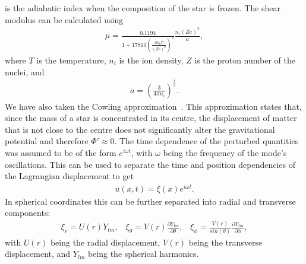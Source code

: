 \documentclass[fleqn,usenatbib]{mnras}
\begin{document}
\noindent is the adiabatic index when the composition of the star is frozen. The shear modulus can be calculated using~\cite{strohmayer1991shear}
\begin{align}
\mu=\frac{0.1194}{1+17810\left(\frac{ak_bT}{\left(Ze\right)^2}\right)^2}\frac{n_i\left(Ze\right)^2}{a},
\label{eq:varymu}
\end{align}
\noindent where $T$ is the temperature, $n_i$ is the ion density, $Z$ is the proton number of the nuclei, and 
\begin{align}
a=\left(\frac{3}{4\pi n_i}\right)^{\frac{1}{3}}.
\label{eq:mu1991a}
\end{align}
\noindent We have also taken the Cowling approximation~\cite{cowling1941non}. This approximation states that, since the mass of a star is concentrated in its centre, the displacement of matter that is not close to the centre does not significantly alter the gravitational potential and therefore $\Phi '\approx 0$. The time dependence of the perturbed quantities was assumed to be of the form $e^{i\omega t}$, with $\omega$ being the frequency of the mode's oscillations. This can be used to separate the time and position dependencies of the Lagrangian displacement to get
\begin{align}
u(x,t)=\xi(x)e^{i\omega t}.
\label{eq:time_seperation}
\end{align}
\noindent In spherical coordinates this can be further separated into radial and transverse components:
\begin{align}
\xi_r=U(r)Y_{lm},\;\;\;\xi_{\theta}=V(r)\frac{\partial Y_{lm}}{\partial\theta},\;\;\;\xi_{\phi}=\frac{V(r)}{sin(\theta)}\frac{\partial Y_{lm}}{\partial\phi},
\label{eq:xi_seperation}
\end{align}
\noindent with $U(r)$ being the radial displacement, $V(r)$ being the transverse displacement, and $Y_{lm}$ being the spherical harmonics.
\end{document}
